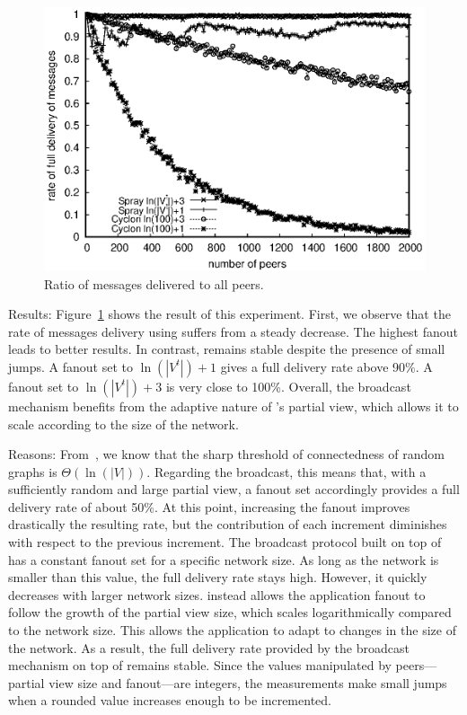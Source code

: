\begin{asparadesc}
\begin{figure}
  \begin{center}
    \includegraphics[width=\SCALE\textwidth]{img/hardrate.eps}
    \caption{\label{fig:hardrate}Ratio of messages delivered to all peers.}
  \end{center}
\end{figure}

\item [Results:] Figure~\ref{fig:hardrate} shows the result of this
  experiment. First, we observe that the rate of messages delivery
  using \CYCLON suffers from a steady decrease. The highest fanout
  leads to better results. In contrast, \SPRAY remains stable despite
  the presence of small jumps. A fanout set to $\ln(|V^t|)+1$ gives a
  full delivery rate above 90\%. A fanout set to $\ln(|V^t|)+3$ is
  very close to 100\%. Overall, the broadcast mechanism benefits from
  the adaptive nature of \SPRAY's partial view, which allows it to
  scale according to the size of the network.
\item [Reasons:] From~\cite{erdos1959random}, we know that the sharp
  threshold of connectedness of random graphs is
  $\Theta(\ln(|V|))$. Regarding the broadcast, this means that, with a
  sufficiently random and large partial view, a fanout set accordingly
  provides a full delivery rate of about 50\%. At this point,
  increasing the fanout improves drastically the resulting rate, but
  the contribution of each increment diminishes with respect to the
  previous increment. The broadcast protocol built on top of \CYCLON
  has a constant fanout set for a specific network size. As long as
  the network is smaller than this value, the full delivery rate stays
  high. However, it quickly decreases with larger network sizes.
  \SPRAY instead allows the application fanout to follow the growth of
  the partial view size, which scales logarithmically compared to the
  network size. This allows the application to adapt to changes in the
  size of the network. As a result, the full delivery rate provided by
  the broadcast mechanism on top of \SPRAY remains stable. Since the
  values manipulated by peers---partial view size and fanout---are
  integers, the measurements make small jumps when a rounded value
  increases enough to be incremented.
\end{asparadesc}

